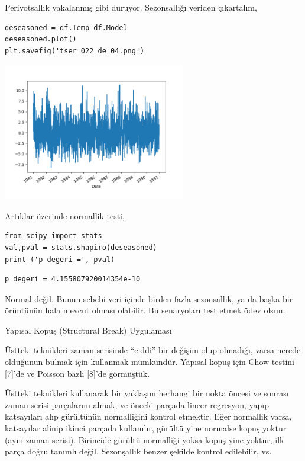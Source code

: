 \documentclass[12pt,fleqn]{article}\usepackage{../../common}
\begin{document}
Periyotsallık yakalanmış gibi duruyor. Sezonsallığı veriden çıkartalım,

\begin{verbatim}
deseasoned = df.Temp-df.Model
deseasoned.plot()
plt.savefig('tser_022_de_04.png')
\end{verbatim}

\includegraphics[height=6cm]{tser_022_de_04.png}

Artıklar üzerinde normallik testi,

\begin{verbatim}
from scipy import stats
val,pval = stats.shapiro(deseasoned)
print ('p degeri =', pval)
\end{verbatim}

\begin{verbatim}
p degeri = 4.155807920014354e-10
\end{verbatim}

Normal değil. Bunun sebebi veri içinde birden fazla sezonsallık, ya da başka bir
örüntünün hala mevcut olması olabilir. Bu senaryoları test etmek ödev olsun.

Yapısal Kopuş (Structural Break) Uygulaması

Üstteki teknikleri zaman serisinde ``ciddi'' bir değişim olup olmadığı, varsa
nerede olduğunun bulmak için kullanmak mümkündür. Yapısal kopuş için Chow
testini [7]'de ve Poisson bazlı [8]'de görmüştük.

Üstteki teknikleri kullanarak bir yaklaşım herhangi bir nokta öncesi ve sonrası
zaman serisi parçalarını almak, ve önceki parçada lineer regresyon, yapıp
katsayıları alıp gürültünün normalliğini kontrol etmektir. Eğer normallik varsa,
katsayılar alinip ikinci parçada kullanılır, gürültü yine normalse kopuş yoktur
(aynı zaman serisi). Birincide gürültü normalliği yoksa kopuş yine yoktur, ilk
parça doğru tanımlı değil. Sezonşallık benzer şekilde kontrol edilebilir, vs.
\end{document}
